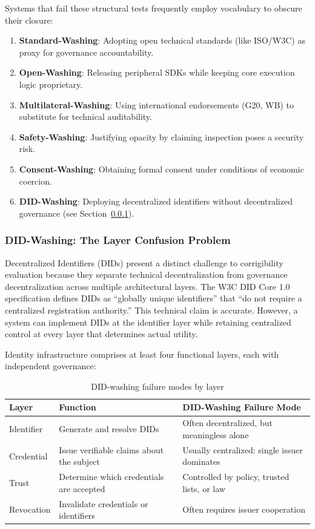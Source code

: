 Systems that fail these structural tests frequently employ vocabulary to obscure their closure:
\begin{enumerate}
    \item \textbf{Standard-Washing}: Adopting open technical standards (like ISO/W3C) as proxy for governance accountability.
    \item \textbf{Open-Washing}: Releasing peripheral SDKs while keeping core execution logic proprietary.
    \item \textbf{Multilateral-Washing}: Using international endorsements (G20, WB) to substitute for technical auditability.
    \item \textbf{Safety-Washing}: Justifying opacity by claiming inspection poses a security risk.
    \item \textbf{Consent-Washing}: Obtaining formal consent under conditions of economic coercion.
    \item \textbf{DID-Washing}: Deploying decentralized identifiers without decentralized governance (see Section~\ref{subsubsec:didwashing}).
\end{enumerate}

\subsubsection{DID-Washing: The Layer Confusion Problem}
\label{subsubsec:didwashing}

Decentralized Identifiers (DIDs) present a distinct challenge to corrigibility evaluation because they separate technical decentralization from governance decentralization across multiple architectural layers. The W3C DID Core 1.0 specification \citep{w3cdid2022} defines DIDs as ``globally unique identifiers'' that ``do not require a centralized registration authority.'' This technical claim is accurate. However, a system can implement DIDs at the identifier layer while retaining centralized control at every layer that determines actual utility.

Identity infrastructure comprises at least four functional layers, each with independent governance:

\begin{table}[htbp]
\centering
\small
\begin{tabular}{@{}llp{5cm}@{}}
\toprule
\textbf{Layer} & \textbf{Function} & \textbf{DID-Washing Failure Mode} \\
\midrule
Identifier & Generate and resolve DIDs & Often decentralized, but meaningless alone \\
Credential & Issue verifiable claims about the subject & Usually centralized: single issuer dominates \\
Trust & Determine which credentials are accepted & Controlled by policy, trusted lists, or law \\
Revocation & Invalidate credentials or identifiers & Often requires issuer cooperation \\
\bottomrule
\end{tabular}
\caption{DID-washing failure modes by layer}
\label{tab:didwashing}
\end{table}

